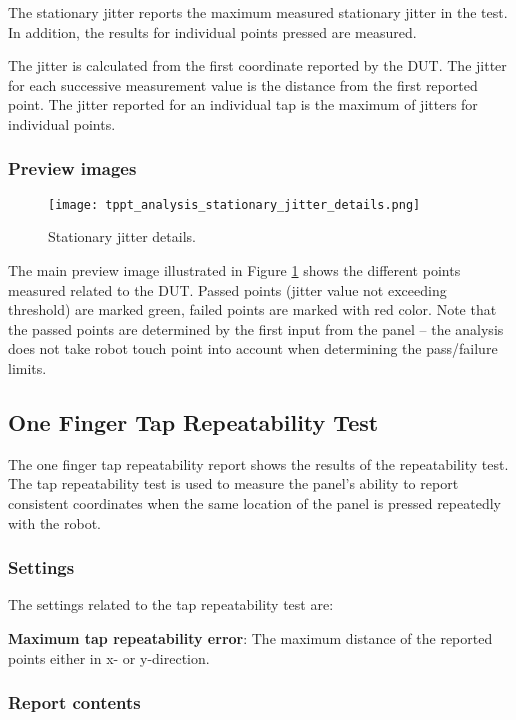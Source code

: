 The stationary jitter reports the maximum measured stationary jitter in the test. In addition, the results for individual points pressed are measured.

The jitter is calculated from the first coordinate reported by the DUT. The jitter for each successive measurement value is the distance from the first reported point. The jitter reported for an individual tap is the maximum of jitters for individual points.

\subsubsection{Preview images}

\begin{figure}[!h]
	\centering
	\texttt{[image: tppt\_analysis\_stationary\_jitter\_details.png]}
	\caption{Stationary jitter details.}
	\label{fig:tppt_analysis_stationary_jitter_details}
\end{figure}

The main preview image illustrated in Figure \ref{fig:tppt_analysis_stationary_jitter_details} shows the different points measured related to the DUT. Passed points (jitter value not exceeding threshold) are marked green, failed points are marked with red color. Note that the passed points are determined by the first input from the panel – the analysis does not take robot touch point into account when determining the pass/failure limits.

\subsection{One Finger Tap Repeatability Test}

The one finger tap repeatability report shows the results of the repeatability test. The tap repeatability test is used to measure the panel’s ability to report consistent coordinates when the same location of the panel is pressed repeatedly with the robot.

\subsubsection{Settings}

The settings related to the tap repeatability test are:

\textbf{Maximum tap repeatability error}: The maximum distance of the reported points either in x- or y-direction.

\subsubsection{Report contents}

